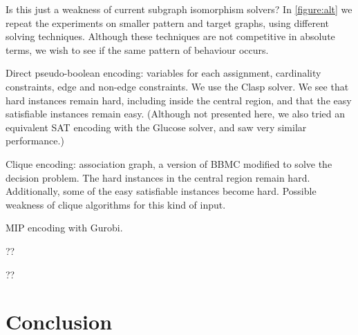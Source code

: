 \documentclass[letterpaper]{article}
\begin{document}
Is this just a weakness of current subgraph isomorphism solvers? In \cref{figure:alt} we repeat the
experiments on smaller pattern and target graphs, using different solving techniques. Although these
techniques are not competitive in absolute terms, we wish to see if the same pattern of behaviour
occurs.

Direct pseudo-boolean encoding: variables for each assignment, cardinality constraints, edge and
non-edge constraints. We use the Clasp solver. We see that hard instances remain hard, including
inside the central region, and that the easy satisfiable instances remain easy. (Although not
presented here, we also tried an equivalent SAT encoding with the Glucose solver, and saw very
similar performance.)

Clique encoding: association graph, a version of BBMC modified to solve the decision problem. The
hard instances in the central region remain hard. Additionally, some of the easy satisfiable
instances become hard. Possible weakness of clique algorithms for this kind of input.

MIP encoding with Gurobi.

?? \cite{Anton:2009}

?? \cite{Lipets:2009}

\section{Conclusion}

\lipsum[11]

\lipsum[12]



\end{document}
